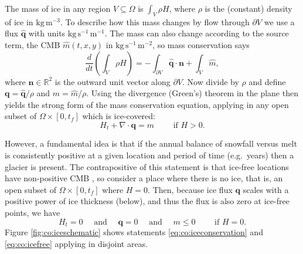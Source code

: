 \documentclass[final,leqno,onefignum,onetabnum]{siamltex1213bueler}
\newcommand{\Div}{\nabla\cdot}
\newcommand\RR{\mathbb{R}}
\begin{document}
\medskip
The mass of ice in any region $V\subseteq \Omega$ is $\int_V \rho H$, where $\rho$ is the (constant) density of ice in $\text{kg} \, \text{m}^{-3}$.  To describe how this mass changes by flow through $\partial V$ we use a flux $\hat{\mathbf{q}}$ with units $\text{kg} \,\text{s}^{-1}\,\text{m}^{-1}$.  The mass can also change according to the source term, the CMB $\hat{m}(t,x,y)$ in $\text{kg} \,\text{s}^{-1}\,\text{m}^{-2}$, so mass conservation says
\begin{equation}
\frac{d}{dt}\left(\int_V \rho H\right) = - \int_{\partial V} \hat{\mathbf{q}} \cdot \mathbf{n} + \int_V \hat{m},
\end{equation}
where $\mathbf{n} \in \RR^2$ is the outward unit vector along $\partial V$.  Now divide by $\rho$ and define $\mathbf{q}=\hat{\mathbf{q}}/\rho$ and $m=\hat{m}/\rho$.  Using the divergence (Green's) theorem in the plane then yields the strong form of the mass conservation equation, applying in any open subset of $\Omega \times [0,t_f]$ which is ice-covered:
\begin{equation}
H_t + \Div \mathbf{q} = m \qquad \text{ if } H>0.   \label{eq:co:iceconservation}
\end{equation}

However, a fundamental idea is that if the annual balance of snowfall versus melt is consistently positive at a given location and period of time (e.g.~years) then a glacier is present.  The contrapositive of this statement is that ice-free locations have non-positive CMB \cite{Bueler2016,JouvetBueler2012}, so consider a place where there is no ice, that is, an open subset of $\Omega \times [0,t_f]$ where $H=0$.  Then, because ice flux $\mathbf{q}$ scales with a positive power of ice thickness (below), and thus the flux is also zero at ice-free points, we have
\begin{equation}
H_t = 0 \quad \text{ and } \quad \mathbf{q} = 0 \quad \text{ and } \quad m \le 0 \qquad \text{ if } H=0.  \label{eq:co:icefree}
\end{equation}
Figure \ref{fig:co:iceschematic} shows statements \eqref{eq:co:iceconservation} and \eqref{eq:co:icefree} applying in disjoint areas.
\end{document}
